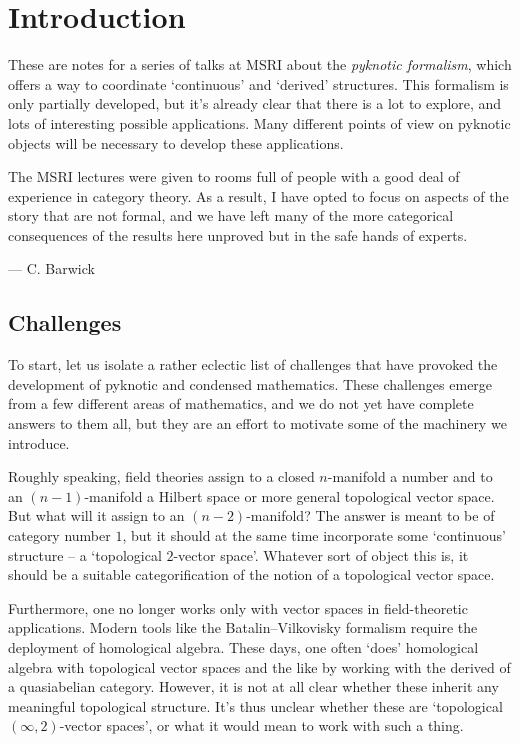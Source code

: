 
\section*{Introduction}

These are notes for a series of talks at MSRI about the \emph{pyknotic formalism}, which offers a way to coordinate `continuous' and `derived' structures.
This formalism is only partially developed, but it’s already clear that there is a lot to explore, and lots of interesting possible applications.
Many different points of view on pyknotic objects will be necessary to develop these applications.

The MSRI lectures were given to rooms full of people with a good deal of experience in category theory.
As a result, I have opted to focus on aspects of the story that are not formal, and we have left many of the more categorical consequences of the results here unproved but in the safe hands of experts.

\noindent --- C. Barwick

\subsection*{Challenges}

To start, let us isolate a rather eclectic list of challenges that have provoked the development of pyknotic and condensed mathematics.
These challenges emerge from a few different areas of mathematics, and we do not yet have complete answers to them all, but they are an effort to motivate some of the machinery we introduce.

\begin{exm*}	
	Roughly speaking, field theories assign to a closed $ n $-manifold a number and to an $ (n-1) $-manifold a Hilbert space or more general topological vector space.
	But what will it assign to an $ (n-2) $-manifold?
	The answer is meant to be of category number $ 1 $, but it should at the same time incorporate some `continuous' structure -- a `topological $ 2 $-vector space'.
	Whatever sort of object this is, it should be a suitable categorification of the notion of a topological vector space.

	Furthermore, one no longer works only with vector spaces in field-theoretic applications.
	Modern tools like the Batalin--Vilkovisky formalism require the deployment of homological algebra.
	These days, one often `does' homological algebra with topological vector spaces and the like by working with the derived \category of a quasiabelian category.
	However, it is not at all clear whether these \categories inherit any meaningful topological structure.
	It's thus unclear whether these \categories are `topological $ (\infty,2) $-vector spaces', or what it would mean to work with such a thing.
\end{exm*}

